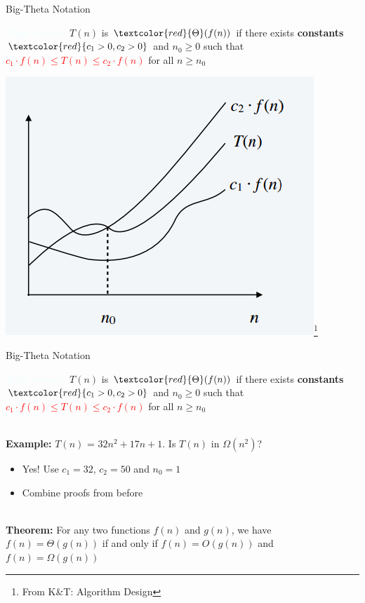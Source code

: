 \documentclass{beamer}
\newcommand{\tblue}[1]{{\Large {\textcolor{azure}{#1}}}}
\newcommand{\hred}[1]{{\textcolor{red}{#1}}}
\begin{document}
\begin{frame}{Big-Theta Notation}

\tblue{Tight bounds:} $T(n)$ is $\hred{\Theta}(f(n))$ if there exists {\bf constants} $\hred{c_1>0, c_2>0}$ and $n_0 \geq 0$ such that
\hred{$c_1 \cdot f(n) \leq T(n) \leq c_2 \cdot f(n)$} for all $n \geq n_0$
\begin{center}
    \includegraphics[scale=0.4]{bigTheta.png}\footnote{From K\&T: Algorithm Design}
\end{center}
\end{frame}


\begin{frame}{Big-Theta Notation}

\tblue{Tight bounds:} $T(n)$ is $\hred{\Theta}(f(n))$ if there exists {\bf constants} $\hred{c_1>0, c_2>0}$ and $n_0 \geq 0$ such that
\hred{$c_1 \cdot f(n) \leq T(n) \leq c_2 \cdot f(n)$} for all $n \geq n_0$

~\\
\textbf{Example:} $T(n)$ = $32n^2+17n+1$.  Is $T(n)$ in $\Omega(n^2)$? 
\begin{itemize}
\item Yes! Use $c_1=32$, $c_2=50$ and $n_0=1$
\item Combine proofs from before
\end{itemize}

~\\
{\bf Theorem:} For any two functions $f(n)$ and $g(n)$, we have $f(n) = \Theta(g(n))$ if and only if 
$f(n) = O(g(n))$ and $f(n)=\Omega(g(n))$ 
\end{frame}
\end{document}
